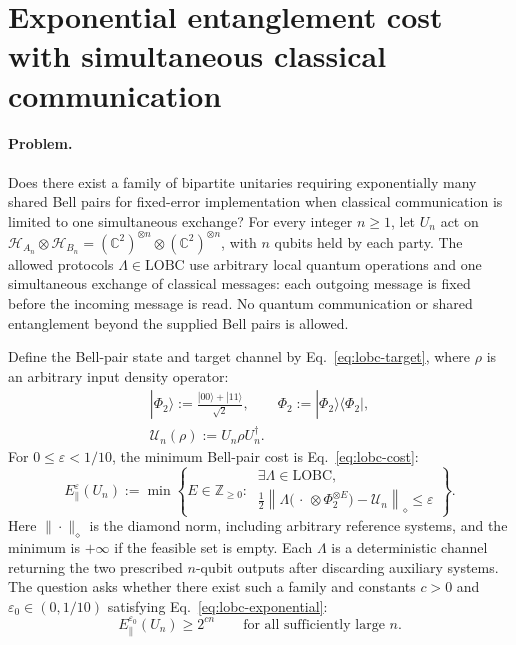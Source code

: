 \section{Exponential entanglement cost with simultaneous classical communication}
\label{sec:op_0ca7986d256cf0df}

\paragraph{Problem.}
Does there exist a family of bipartite unitaries requiring exponentially many shared Bell pairs for fixed-error implementation when classical communication is limited to one simultaneous exchange? For every integer $n\geq1$, let $U_n$ act on $\mathcal H_{A_n}\otimes\mathcal H_{B_n}=(\mathbb C^2)^{\otimes n}\otimes(\mathbb C^2)^{\otimes n}$, with $n$ qubits held by each party. The allowed protocols $\Lambda\in\mathrm{LOBC}$ use arbitrary local quantum operations and one simultaneous exchange of classical messages: each outgoing message is fixed before the incoming message is read. No quantum communication or shared entanglement beyond the supplied Bell pairs is allowed.

Define the Bell-pair state and target channel by Eq.~\eqref{eq:lobc-target}, where $\rho$ is an arbitrary input density operator:
\begin{equation}
\begin{gathered}
|\Phi_2\rangle:=\frac{|00\rangle+|11\rangle}{\sqrt2},\qquad
\Phi_2:=|\Phi_2\rangle\langle\Phi_2|,\\
\mathcal U_n(\rho):=U_n\rho U_n^\dagger.
\end{gathered}
\label{eq:lobc-target}
\end{equation}
For $0\leq\varepsilon<1/10$, the minimum Bell-pair cost is Eq.~\eqref{eq:lobc-cost}:
\begin{equation}
E_{\parallel}^{\varepsilon}(U_n):=\min\left\{
E\in\mathbb Z_{\geq0}:\ \begin{gathered}
\exists\Lambda\in\mathrm{LOBC},\\
\frac12\left\|\Lambda\bigl(\,\cdot\,\otimes\Phi_2^{\otimes E}\bigr)-\mathcal U_n\right\|_{\diamond}\leq\varepsilon
\end{gathered}\right\}.
\label{eq:lobc-cost}
\end{equation}
Here $\|\cdot\|_{\diamond}$ is the diamond norm, including arbitrary reference systems, and the minimum is $+\infty$ if the feasible set is empty. Each $\Lambda$ is a deterministic channel returning the two prescribed $n$-qubit outputs after discarding auxiliary systems. The question asks whether there exist such a family and constants $c>0$ and $\varepsilon_0\in(0,1/10)$ satisfying Eq.~\eqref{eq:lobc-exponential}:
\begin{equation}
E_{\parallel}^{\varepsilon_0}(U_n)\geq2^{cn}
\qquad\text{for all sufficiently large }n.
\label{eq:lobc-exponential}
\end{equation}

